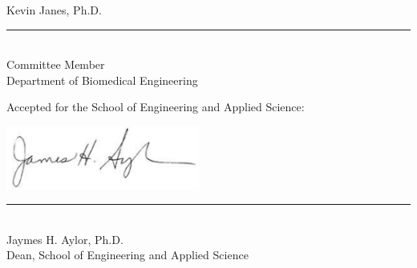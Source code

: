 \begin{center}
\begin{flushright}
\Large{ Kevin Janes, Ph.D. } \\[-0.11in]
\rule{0.5\textwidth}{0.5pt} \\[-0.02in]
\normalsize{Committee Member \\ Department of Biomedical Engineering}
\end{flushright}

\vspace{0.3in}

Accepted for the School of Engineering and Applied Science:

\vspace{0.15in}

\begin{flushright}
\includegraphics[width=2.5in]{ApprovalSheet/signature.png}\\[-0.44in]
\rule{0.5\textwidth}{0.5pt} \\[-0.02in]
\normalsize{ Jaymes H. Aylor, Ph.D. \\ Dean, School of Engineering and Applied Science}
\end{flushright}

\end{center}

